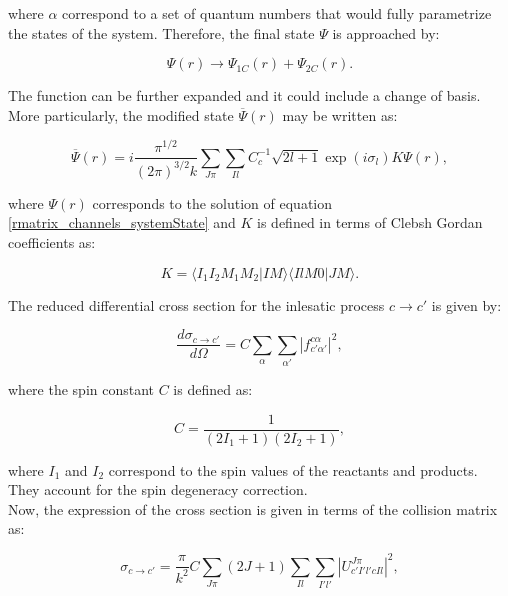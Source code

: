 \documentclass[openany]{book}
\begin{document}
where $\alpha$ correspond to a set of quantum numbers that would fully parametrize the states of the system. Therefore, the final state $\Psi$ is approached by: 

\begin{equation}\label{rmatrix_channels_state_final}
	\Psi(r) \rightarrow \Psi_{1C}(r) + \Psi_{2C}(r).
\end{equation}

The function can be further expanded and it could include a change of basis. More particularly, the modified state $	\overline \Psi(r)$ may be written as:

\begin{equation}\label{rmatrix_channels_state_final_change}
	\overline \Psi(r) = i \frac{\pi^{1/2}}{(2\pi)^{3/2} k} \sum_{J\pi} \sum_{Il} C^{-1}_c \sqrt{2l + 1} \exp (i\sigma_l) K \Psi(r),
\end{equation}

where $\Psi(r)$ corresponds to the solution of equation \ref{rmatrix_channels_systemState} and $K$ is defined in terms of Clebsh Gordan coefficients as: 

\begin{equation}\label{rmatrix_channels_state_final_clebshGordan}
	K = \langle I_1 I_2 M_1 M_2 | IM\rangle \langle IlM0 | JM\rangle.
\end{equation}


The reduced differential cross section for the inlesatic process $c\rightarrow c'$ is given by:

\begin{equation}\label{rmatrix_difcrossSection_ccprime}
	\frac{d\sigma_{c\rightarrow c'}}{d\Omega} = C \sum_{\alpha} \sum_{\alpha'} |f^{c\alpha}_{c'\alpha'}|^2,
\end{equation}

where the spin constant $C$ is defined as:

\begin{equation}\label{rmatrix_difcrossSection_spinConstant}
	C = \frac{1}{(2I_1 + 1)(2I_2 + 1)},
\end{equation}

where $I_1$ and $I_2$ correspond to the spin values of the reactants and products. They account for the spin degeneracy correction. \\

Now, the expression of the cross section is given in terms of the collision matrix as:

\begin{equation}\label{rmatrix_crossSection_ccprime}
	\sigma_{c\rightarrow c'} = \frac{\pi}{k^2} C \sum_{J\pi} {(2J +1) \sum_{Il} \sum_{I'l'} |U^{J\pi}_{c'I'l'cIl}|^2},
\end{equation}
\end{document}
